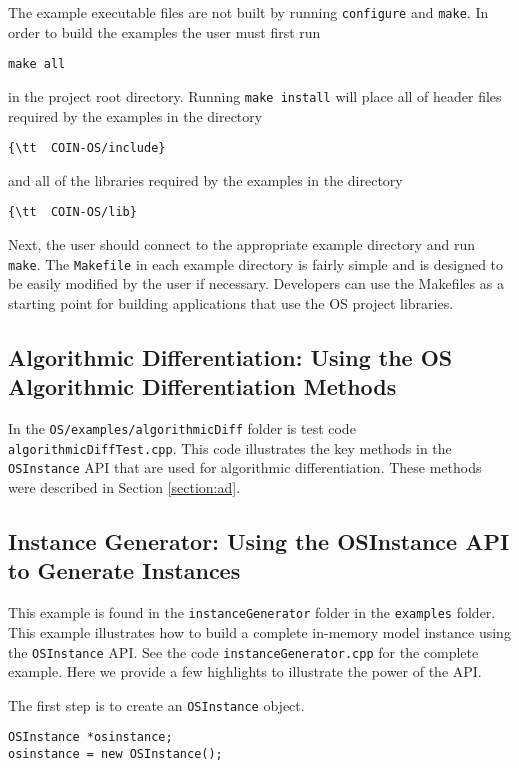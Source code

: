 \documentclass[11pt]{article}
\renewcommand{\_}{{\char"5F}}
\renewcommand{\{}{{\char"7B}}
\renewcommand{\}}{{\char"7D}}
\renewcommand{\^}{{\char"0D}}
\renewcommand{\'}{{\char"0D}}
\begin{document}
The example executable files are not built by running {\tt configure} and {\tt make}.  In order to build the examples the user must first run 
\begin{verbatim}
make all
\end{verbatim}
in the project root directory.  Running {\tt make install}  will  place all of header files required by the examples in the directory
\begin{verbatim}
{\tt  COIN-OS/include}
\end{verbatim}
and all of the libraries required by the examples in the directory
\begin{verbatim}
{\tt  COIN-OS/lib}
\end{verbatim}
Next, the user should connect to the appropriate example directory and run {\tt make}.      The {\tt Makefile} in each example directory is fairly simple and is designed to be easily modified by the user if necessary.  Developers can use the Makefiles as a starting point for building applications that use the OS project libraries. 


\subsection{Algorithmic Differentiation:  Using the OS Algorithmic Differentiation Methods}\label{section:cppad}

In the {\tt OS/examples/algorithmicDiff} folder is test code {\tt algorithmicDiffTest.cpp}. This code illustrates the key methods in the {\tt OSInstance} API that are used for algorithmic differentiation.   These methods were described in Section \ref{section:ad}.



\subsection{Instance Generator: Using the OSInstance API to Generate Instances}\label{subsection:exampleOSInstanceGeneration}

This example is found in the {\tt instanceGenerator} folder in the {\tt examples} folder.  This example illustrates how to build a complete in-memory model instance using the {\tt OSInstance} API.   See the code {\tt instanceGenerator.cpp} for the complete example. Here we provide a few highlights to illustrate the power of the API.

The first step is to create an {\tt OSInstance} object.
\begin{verbatim}
OSInstance *osinstance;
osinstance = new OSInstance();
\end{verbatim}
\end{document}
